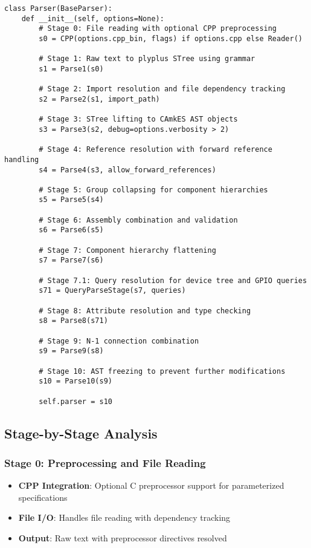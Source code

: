 \documentclass[12pt,a4paper]{article}
\begin{document}

\begin{lstlisting}[style=python]
class Parser(BaseParser):
    def __init__(self, options=None):
        # Stage 0: File reading with optional CPP preprocessing
        s0 = CPP(options.cpp_bin, flags) if options.cpp else Reader()
        
        # Stage 1: Raw text to plyplus STree using grammar
        s1 = Parse1(s0)
        
        # Stage 2: Import resolution and file dependency tracking
        s2 = Parse2(s1, import_path)
        
        # Stage 3: STree lifting to CAmkES AST objects
        s3 = Parse3(s2, debug=options.verbosity > 2)
        
        # Stage 4: Reference resolution with forward reference handling
        s4 = Parse4(s3, allow_forward_references)
        
        # Stage 5: Group collapsing for component hierarchies
        s5 = Parse5(s4)
        
        # Stage 6: Assembly combination and validation
        s6 = Parse6(s5)
        
        # Stage 7: Component hierarchy flattening
        s7 = Parse7(s6)
        
        # Stage 7.1: Query resolution for device tree and GPIO queries
        s71 = QueryParseStage(s7, queries)
        
        # Stage 8: Attribute resolution and type checking
        s8 = Parse8(s71)
        
        # Stage 9: N-1 connection combination
        s9 = Parse9(s8)
        
        # Stage 10: AST freezing to prevent further modifications
        s10 = Parse10(s9)
        
        self.parser = s10
\end{lstlisting}

\subsection{Stage-by-Stage Analysis}

\subsubsection{Stage 0: Preprocessing and File Reading}
\begin{itemize}
    \item \textbf{CPP Integration}: Optional C preprocessor support for parameterized specifications
    \item \textbf{File I/O}: Handles file reading with dependency tracking
    \item \textbf{Output}: Raw text with preprocessor directives resolved
\end{itemize}
\end{document}
